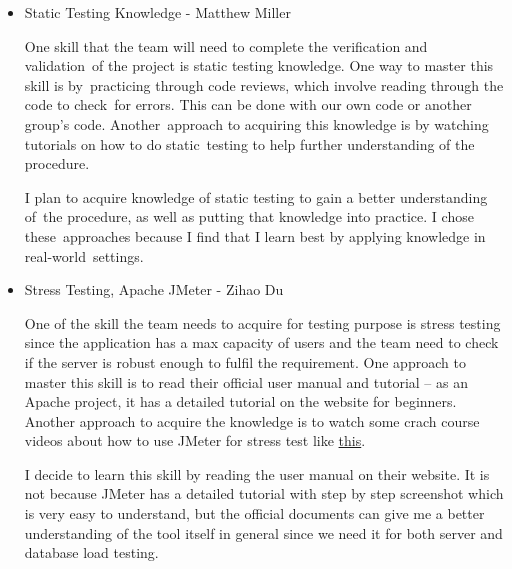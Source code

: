\documentclass[12pt, titlepage]{article}
\begin{document}
\begin{itemize}
	\item Static Testing Knowledge - Matthew Miller
	
	One skill that the team will need to complete the verification and validation\
	of the project is static testing knowledge. One way to master this skill is by\
	practicing through code reviews, which involve reading through the code to check\
	for errors. This can be done with our own code or another group's code. Another\
	approach to acquiring this knowledge is by watching tutorials on how to do static\
	testing to help further understanding of the procedure.

	I plan to acquire knowledge of static testing to gain a better understanding of\
	the procedure, as well as putting that knowledge into practice. I chose these\
	approaches because I find that I learn best by applying knowledge in real-world\
	settings.
	
	\item Stress Testing, Apache JMeter - Zihao Du
	
	One of the skill the team needs to acquire for testing purpose is stress testing since the application has a max capacity of users and the team need to check if the server is robust enough to fulfil the requirement. One approach to master this skill is to read their official user manual and tutorial -- as an Apache project, it has a detailed tutorial on the website for beginners. Another approach to acquire the knowledge is to watch some crach course videos about how to use JMeter for stress test like \href{https://www.youtube.com/watch?v=mXGcBvWYl-U}{this}. 
	
	I decide to learn this skill by reading the user manual on their website. It is not because JMeter has a detailed tutorial with step by step screenshot which is very easy to understand, but the official documents can give me a better understanding of the tool itself in general since we need it for both server and database load testing.

\end{itemize}
\end{document}
